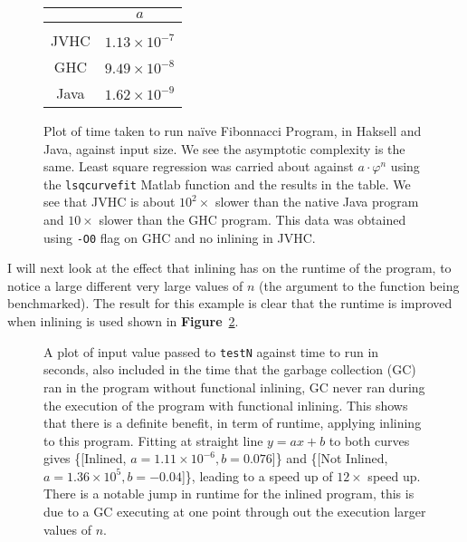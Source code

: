 \documentclass[float=false, crop=false]{standalone}
\newlength\gwidth
\newlength\gheight
\newcommand{\namefig}{\textbf{Figure}~}
\newcommand{\importMGraph}[3]{\setlength{\gwidth}{#2}\setlength{\gheight}{#3}{#1}}
\begin{document}
\begin{figure}
  \centering
  \importMGraph{plotFibRuntime.tex}{0.93\textwidth}{0.4\textwidth}
\begin{tabular}{c | c}
  & $a$\\
  \hline \\
  JVHC & $1.13\times 10^{-7}$\\
  GHC & $9.49\times 10^{-8}$\\
  Java & $1.62 \times 10^{-9}$
\end{tabular}
  \caption[Plot of a comparison between runtime for finding the $n$th Fibonacci number na\"ively as a 
  function of the $n$]
  {Plot of time taken to run na\"ive Fibonnacci Program, in Haksell
  and Java, against input size. We see the asymptotic complexity is the same.
  Least square regression was carried about against $a \cdot \varphi^n$ using the 
  \texttt{lsqcurvefit} Matlab function and the results in the table.
  We see that JVHC is about $10^2 \times$ slower than the native
  Java program and $10\times $ slower than the GHC program.
  This data was obtained using \texttt{-O0} flag on GHC and no inlining
  in JVHC.
}
  \label{plot:fibTiming}
\end{figure}


I will next look at the effect that inlining has on the runtime of the 
program, to notice a large different very large values of $n$ (the 
argument to the function being benchmarked). The result for this
example is clear that the runtime is improved when inlining is used shown in \namefig\ref{plot:inlinePlot}.

\begin{figure}
  \centering
  \importMGraph{inlinePlot}{0.96\textwidth}{0.4\textwidth}
  \caption[Plot of runtime of \texttt{testN} as a function on input size $n$]
  {A plot of input value passed to \texttt{testN} against time to run in seconds,
    also included in the time that the garbage collection (GC) ran in the program without
    functional inlining, GC never ran during the execution of the 
    program with functional inlining. This
  shows that there is a definite benefit, in term of runtime, applying inlining to this
  program. Fitting at straight line $y=ax+b$ to both curves gives 
  \{[Inlined, $a=1.11\times 10^{-6}, b = 0.076$]\} and 
  \{[Not Inlined, $a = 1.36\times 10^{5}, b= -0.04$]\}, leading to a speed up of $12 \times$ speed up.
  There is a notable jump in runtime for the inlined program, this is due to a GC 
  executing at one point through out the execution larger values of $n$. }
  \label{plot:inlinePlot}

\end{figure}
\end{document}
